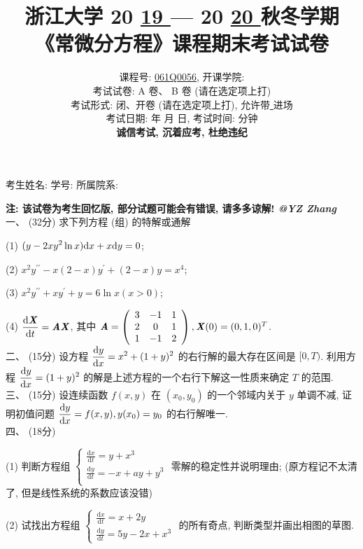 \documentclass[UTF8]{ctexart}
\title{
\textbf{浙江大学 }20 \underline{ 19 } — 20 \underline{ 20 } \textbf{秋冬学期} \\
\textbf{《常微分方程》课程期末考试试卷}
}
\author{
课程号: \underline{ \quad061Q0056\quad }, 开课学院: \underline{ \quad数学科学学院\quad } \\
考试试卷: \checkmark A 卷、 B 卷 (请在选定项上打\checkmark) \\
考试形式: \checkmark 闭、开卷 (请在选定项上打\checkmark), 允许带\underline{ \quad无\quad  }进场 \\
考试日期: \underline{ \quad2020\quad } 年 \underline{ \quad01\quad } 月 \underline{ \quad09\quad } 日, 考试时间: \underline{ \quad120\quad }分钟 \\
\textbf{诚信考试, 沉着应考, 杜绝违纪}
}
\date{}
\begin{document}
\maketitle
\begin{center}
考生姓名: \underline{\quad\quad\quad\quad\quad\quad\quad\quad\quad\quad} 学号: \underline{\quad\quad\quad\quad\quad\quad\quad\quad\quad\quad} 所属院系: \underline{\quad\quad\quad\quad\quad\quad\quad\quad\quad\quad}
\end{center}

\textbf{注: 该试卷为考生回忆版, 部分试题可能会有错误, 请多多谅解! \textit{@YZ Zhang}}
\\

一、 (32分) 求下列方程 (组) 的特解或通解

(1) $\displaystyle(y-2xy^2\ln x){\rm d}x+x{\rm d}y=0$;

(2) $\displaystyle x^2y^{\prime\prime}-x(2-x)y^{\prime}+(2-x)y=x^4$;

(3) $x^2y^{\prime\prime}+xy^{\prime}+y=6\ln x(x>0)$;

(4) $\displaystyle\frac{{\rm d}\textbf{\textit{X}}}{{\rm d}t}=\textbf{\textit{AX}}$, 其中 $\textbf{\textit{A}}=
\left(\begin{array}{ccc}
3 & -1 & 1 \\
2 & 0 & 1 \\
1 & -1 & 2
\end{array}\right),\textbf{\textit{X}}(0)=(0,1,0)^T$.
\\

二、 (15分) 设方程 $\displaystyle\frac{{\rm d}y}{{\rm d}x}=x^2+(1+y)^2$ 的右行解的最大存在区间是 $[0,T)$. 利用方程 $\displaystyle\frac{{\rm d}y}{{\rm d}x}=(1+y)^2$ 的解是上述方程的一个右行下解这一性质来确定 $T$ 的范围.
\\

三、 (15分) 设连续函数 $f(x,y)$ 在 $(x_0,y_0)$ 的一个邻域内关于 $y$ 单调不减, 证明初值问题 $\displaystyle\frac{{\rm d}y}{{\rm d}x}=f(x,y), y(x_0)=y_0$ 的右行解唯一.
\\

四、 (18分)

(1) 判断方程组 $\begin{cases}
	\displaystyle\frac{\text{d}x}{\text{d}t}=y+x^3\\
	\displaystyle\frac{\text{d}y}{\text{d}t}=-x+ay+y^3\\
    \end{cases}$ 零解的稳定性并说明理由; (原方程记不太清了, 但是线性系统的系数应该没错)

(2) 试找出方程组 $\begin{cases}
              \displaystyle\frac{\text{d}x}{\text{d}t}=x+2y\\
              \displaystyle\frac{\text{d}y}{\text{d}t}=5y-2x+x^3
            \end{cases}$ 的所有奇点, 判断类型并画出相图的草图.
\\
\end{document}
